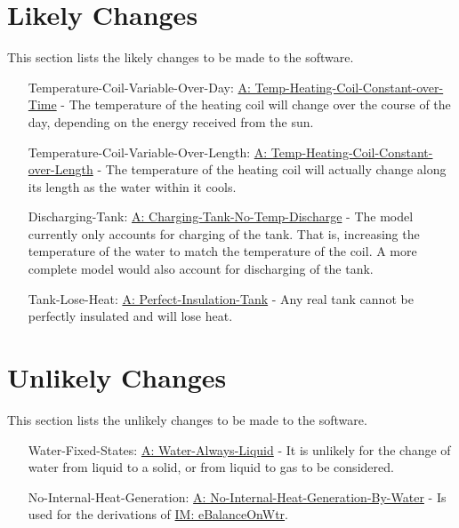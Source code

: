 \documentclass[12pt]{article}
\begin{document}
\section{Likely Changes}
\label{Sec:LCs}
This section lists the likely changes to be made to the software.

\begin{itemize}
\item[Temperature-Coil-Variable-Over-Day:\phantomsection\label{likeChgTCVOD}]\hyperref[assumpTHCCoT]{A: Temp-Heating-Coil-Constant-over-Time} - The temperature of the heating coil will change over the course of the day, depending on the energy received from the sun.
\item[Temperature-Coil-Variable-Over-Length:\phantomsection\label{likeChgTCVOL}]\hyperref[assumpTHCCoL]{A: Temp-Heating-Coil-Constant-over-Length} - The temperature of the heating coil will actually change along its length as the water within it cools.
\item[Discharging-Tank:\phantomsection\label{likeChgDT}]\hyperref[assumpCTNTD]{A: Charging-Tank-No-Temp-Discharge} - The model currently only accounts for charging of the tank. That is, increasing the temperature of the water to match the temperature of the coil. A more complete model would also account for discharging of the tank.
\item[Tank-Lose-Heat:\phantomsection\label{likeChgTLH}]\hyperref[assumpPIT]{A: Perfect-Insulation-Tank} - Any real tank cannot be perfectly insulated and will lose heat.
\end{itemize}
\section{Unlikely Changes}
\label{Sec:UCs}
This section lists the unlikely changes to be made to the software.

\begin{itemize}
\item[Water-Fixed-States:\phantomsection\label{unlikeChgWFS}]\hyperref[assumpWAL]{A: Water-Always-Liquid} - It is unlikely for the change of water from liquid to a solid, or from liquid to gas to be considered.
\item[No-Internal-Heat-Generation:\phantomsection\label{unlikeChgNIHG}]\hyperref[assumpNIHGBW]{A: No-Internal-Heat-Generation-By-Water} - Is used for the derivations of \hyperref[IM:eBalanceOnWtr]{IM: eBalanceOnWtr}.
\end{itemize}
\end{document}
